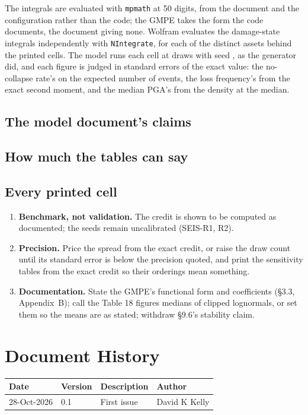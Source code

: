 \documentclass[11pt,a4paper]{article}
\renewcommand{\mkmhistorypage}[1]{%
    \section{Document History}
    \begin{table}[ht]
        \centering
        \begin{tabular}{l|l|p{9cm}|l}
            \textbf{Date} & \textbf{Version} & \textbf{Description} & \textbf{Author} \\
            \hline
            #1
        \end{tabular}
    \end{table}
}
\begin{document}
The integrals are evaluated with \texttt{mpmath} at 50 digits, from the document and
the configuration rather than the code; the GMPE takes the form the code documents,
the document giving none. Wolfram evaluates the damage-state integrals independently
with \texttt{NIntegrate}, for each of the \bmAssets{} distinct assets behind the
\bmCells{} printed cells. The model runs each cell at \bmNSim{} draws with seed \bmSeed,
as the generator did, and each figure is judged in standard errors of the exact
value: the no-collapse rate's on the expected number of events, the loss frequency's
from the exact second moment, and the median PGA's from the density at the median.

\mkmvalidation



\subsection{The model document's claims}


\subsection{How much the tables can say}



\subsection{Every printed cell}


\mkmlimitations

\begin{enumerate}[leftmargin=*]
\item \textbf{Benchmark, not validation.} The credit is shown to be computed as
  documented; the seeds remain uncalibrated (SEIS-R1, R2).
\item \textbf{Precision.} Price the spread from the exact credit, or raise the draw
  count until its standard error is below the precision quoted, and print the
  sensitivity tables from the exact credit so their orderings mean something.
\item \textbf{Documentation.} State the GMPE's functional form and coefficients
  (\S3.3, Appendix~B); call the Table 18 figures medians of clipped lognormals, or
  set them so the means are as stated; withdraw \S9.6's stability claim.
\end{enumerate}

\mkmhistorypage{28-Oct-2026 & 0.1 & First issue & David K Kelly \\}
\end{document}
